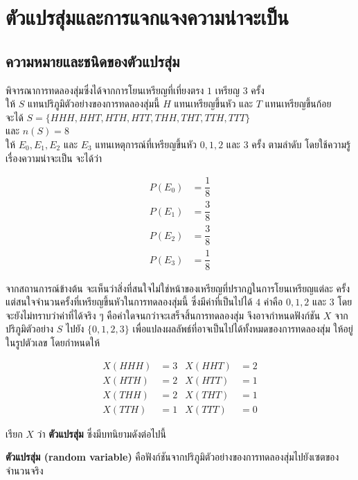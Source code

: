 \chapter{ตัวแปรสุ่มและการแจกแจงความน่าจะเป็น}
\section{ความหมายและชนิดของตัวแปรสุ่ม}
พิจารณาการทดลองสุ่มซึ่งได้จากการโยนเหรียญที่เที่ยงตรง $1$ เหรียญ $3$ ครั้ง\\
ให้ $S$ แทนปริภูมิตัวอย่างของการทดลองสุ่มนี้ $H$ แทนเหรียญขึ้นหัว และ $T$ แทนเหรียญขึ้นก้อย\\
จะได้ $S=\{HHH, HHT, HTH, HTT, THH, THT, TTH, TTT\}$\\
และ $n(S)=8$\\
ให้ $E_{0}, E_{1}, E_{2}$ และ $E_{3}$ แทนเหตุการณ์ที่เหรียญขึ้นหัว $0, 1, 2$ และ $3$ ครั้ง ตามลำดับ โดยใช้ความรู้เรื่องความน่าจะเป็น จะได้ว่า

\begin{align*}
	P\left(E_{0}\right)&=\dfrac{1}{8} \\ P\left(E_{1}\right)&=\dfrac{3}{8} \\
P\left(E_{2}\right)&=\dfrac{3}{8}\\
  P\left(E_{3}\right) &=\dfrac{1}{8}
\end{align*}

จากสถานการณ์ข้างต้น จะเห็นว่าสิ่งที่สนใจไม่ใช่หน้าของเหรียญที่ปรากฏในการโยนเหรียญแต่ละ ครั้ง แต่สนใจจำนวนครั้งที่เหรียญขึ้นหัวในการทดลองสุ่มนี้ ซึ่งมีค่าที่เป็นไปได้ $4$ ค่าคือ $0, 1, 2$ และ $3$ โดยจะยังไม่ทราบว่าค่าที่ได้จริง ๆ คือค่าใดจนกว่าจะเสร็จสิ้นการทดลองสุ่ม จึงอาจกำหนดฟังก์ชัน $X$ จากปริภูมิตัวอย่าง $S$ ไปยัง $\{0, 1, 2, 3\}$ เพื่อแปลงผลลัพธ์ที่อาจเป็นไปได้ทั้งหมดของการทดลองสุ่ม ให้อยู่ในรูปตัวเลข โดยกำหนดให้

\begin{align*}
	X(HHH) &= 3 & X(HHT) &= 2 \\
	X(HTH) &= 2 & X(HTT) &= 1 \\
	X(THH) &= 2 & X(THT) &= 1 \\
	X(TTH) &= 1 & X(TTT) &= 0
\end{align*}

เรียก $X$ ว่า \textbf{ตัวแปรสุ่ม} ซึ่งมีบทนิยามดังต่อไปนี้

\begin{definitionbox}
\textbf{ตัวแปรสุ่ม (random variable)} คือฟังก์ชันจากปริภูมิตัวอย่างของการทดลองสุ่มไปยังเซตของจำนวนจริง
\end{definitionbox}


